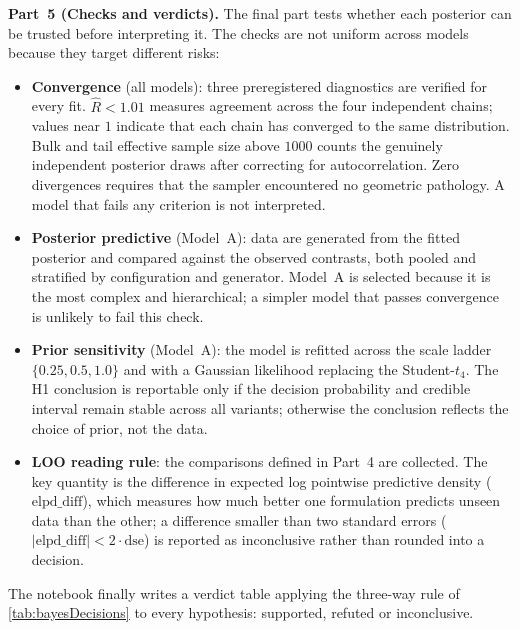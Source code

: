 \medskip
\textbf{Part~5 (Checks and verdicts).} The final part tests whether each posterior can be trusted before interpreting it. The checks are not uniform across models because they target different risks:
\begin{itemize}\setlength{\itemsep}{2pt}
    \item \textbf{Convergence} (all models): three preregistered diagnostics are verified for every fit. $\hat R < 1.01$ measures agreement across the four independent chains; values near $1$ indicate that each chain has converged to the same distribution. Bulk and tail effective sample size above $1000$ counts the genuinely independent posterior draws after correcting for autocorrelation. Zero divergences requires that the sampler encountered no geometric pathology. A model that fails any criterion is not interpreted.
    \item \textbf{Posterior predictive} (Model~A): data are generated from the fitted posterior and compared against the observed contrasts, both pooled and stratified by configuration and generator. Model~A is selected because it is the most complex and hierarchical; a simpler model that passes convergence is unlikely to fail this check.
    \item \textbf{Prior sensitivity} (Model~A): the model is refitted across the scale ladder $\{0.25,0.5,1.0\}$ and with a Gaussian likelihood replacing the Student-$t_4$. The H1 conclusion is reportable only if the decision probability and credible interval remain stable across all variants; otherwise the conclusion reflects the choice of prior, not the data.
    \item \textbf{LOO reading rule}: the comparisons defined in Part~4 are collected. The key quantity is the difference in expected log pointwise predictive density ($\text{elpd\_diff}$), which measures how much better one formulation predicts unseen data than the other; a difference smaller than two standard errors ($|\text{elpd\_diff}| < 2\cdot\text{dse}$) is reported as inconclusive rather than rounded into a decision.
\end{itemize}
The notebook finally writes a verdict table applying the three-way rule of \autoref{tab:bayesDecisions} to every hypothesis: supported, refuted or inconclusive.
